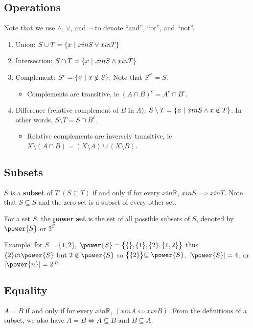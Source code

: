 \documentclass[12pt]{article}
\newcommand{\R}[1]{\mathbb{R}^{#1}}
\begin{document}
\subsection*{Operations}
Note that we use $\land$, $\lor$, and $\neg$ to denote ``and'', ``or'', and ``not''.
\begin{enumerate}
\item Union: $S \cup T = \{ x \ |\  x in S \lor x in T \}$
\item Intersection: $S \cap T = \{ x \ |\  x in S \land x in T \}$
\item Complement: $S^c = \{ x \ |\  x \notin S \}$. Note that $S^{c^c} = S$.
\begin{itemize}
\item Complements are transitive, ie $(A \cap B)^c = A^c \cap B^c$.
\end{itemize}
\item Difference (relative complement of $B$ in $A$): $S \setminus T = \{ x \ |\  x in S \land x \notin T \}$. In other words, $S \setminus T = S \cap B^c$.
\begin{itemize}
\item Relative complements are inversely transitive, ie $X \setminus (A \cap B) = (X \setminus A) \cup (X \setminus B)$.
\end{itemize}
\end{enumerate}

\subsection*{Subsets}
 $S$ is a {\bf subset} of $T$ $(S \subseteq T)$ if and only if for every $x in \R{}$, $x in S \implies x in T$. Note that $S \subseteq S$ and the zero set is a subset of every other set.

For a set $S$, the {\bf power set} is the set of all possible subsets of $S$, denoted by $\power{S}$ or $2^S$

Example: for $S = \{ 1,2 \}$, $\power{S} = \bigl\{ \{\}, \{1\}, \{2\}, \{1,2\} \bigl\}$ thus $\{2\} in \power{S}$ but $2 \notin \power{S}$ so $\bigl\{ \{2\} \bigl\} \subseteq \power{S}$. $|\power{S}| = 4$, or $|\power{n}| = 2^{|n|}$

\subsection*{Equality}
$A = B$ if and only if for every $x in \R{}$, $(x in A \iff x in B)$. From the definitions of a subset, we also have $A = B \iff A \subseteq B$ and $B \subseteq A$.
\end{document}
